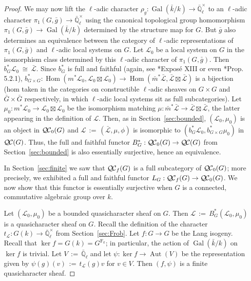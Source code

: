 \documentclass[11pt]{amsart}
\theoremstyle{plain}
\theoremstyle{definition}
\theoremstyle{remark}
\newcommand{\EE}{\mathbb{\bar Q}_\ell}
\newcommand{\bFq}{\bar{k}}
\newcommand{\Fq}{k}
\newcommand{\EEx}{\EE^\times}
\DeclareMathOperator{\Gal}{Gal}
\newcommand{\Frob}[1]{\operatorname{F}_{#1}}
\DeclareMathOperator{\Aut}{Aut}
\DeclareMathOperator{\Hom}{Hom}
\newcommand{\ceq}{{\, :=\, }}
\newcommand{\iso}{{\ \cong\ }}
\newcommand{\qcs}[1]{{\mathcal{#1}}}
\newcommand{\gqcs}[1]{{\mathcal{\bar #1}}}
\newcommand{\QC}{{\mathcal{Q\hskip-0.8pt C}}}
\newcommand{\QCb}{{\QC_0}}
\newcommand{\QCf}{{\QC_f}}
\newcommand{\trFrob}[1]{t_{#1}}
\newcommand{\bg}{\bar{g}}
\begin{document}
\begin{proof}
  We may now lift the $\ell$-adic character $\rho_g : \Gal(\bFq/\Fq) \to \EEx$
  to an $\ell$-adic character $\pi_1(G,\bg) \to \EEx$ using the canonical topological group homomorphism
  $\pi_1(G,\bg) \to \Gal(\bFq/\Fq)$ determined by the structure map for $G$. But $\bg$ also
  determines an equivalence between the category of $\ell$-adic
  representations of $\pi_1(G,\bg)$ and $\ell$-adic local systems on $G$. Let
  $\qcs{L}_0$ be a local system on $G$ in the isomorphism class
  determined by this $\ell$-adic character of $\pi_1(G,\bg)$.
  Then $b_G^*\qcs{L}_0 \iso \gqcs{L}$.
  Since $b_G^*$ is full and faithful (again, see \cite{deligne-katz:SGA7.2}*{Expos\'e XIII}
  or even \cite{beilinson-bernstein-deligne:81a}*{Prop. 5.2.1}),
  $
  b_{G\times G}^* : \Hom(m^*\qcs{L}_0,\qcs{L}_0\boxtimes\qcs{L}_0) \to \Hom({\bar m}^*\gqcs{L},\gqcs{L}\boxtimes\gqcs{L})
  $ 
  is a bijection 
  (hom taken in the categories on constructible $\ell$-adic sheaves on 
  $G\times G$ and ${\bar G}\times {\bar G}$ respectively, 
  in which $\ell$-adic local systems sit as full subcategories). 
  Let $\mu_0 : m^*\qcs{L}_0 \to \qcs{L}_0\boxtimes\qcs{L}_0$ be the isomorphism matching 
  $\mu : {\bar m}^*\gqcs{L} \to \gqcs{L}\boxtimes\gqcs{L}$, 
  the latter appearing in the definition of $\qcs{L}$. 
  Then, as in Section~\ref{sec:bounded}, $(\qcs{L}_0,\mu_0)$ is an object in $\QCb(G)$ 
  and $\qcs{L} \ceq (\gqcs{L},\mu,\phi)$ is isomorphic to $(b_G^*\qcs{L}_0,b_{G\times G}^*\mu_0)$ in $\QC(G)$.
  Thus, the full and faithful functor $B_G^* : \QCb(G) \to \QC(G)$ from Section~\ref{sec:bounded}
  is also essentially surjective, hence an equivalence.
  
  In Section~\ref{sec:finite} we saw that $\QCf(G)$ is a full subcategory of $\QCb(G)$;
  more precisely, we exhibited a full and faithful functor $L_G : \QCf(G) \to \QCb(G)$.
  We now show that this functor is essentially surjective 
  when $G$ is a connected, commutative algebraic group over $\Fq$.
  
  Let $(\qcs{L}_0,\mu_0)$ be a bounded quasicharacter sheaf on $G$. 
  Then $\qcs{L}\ceq B_G^*(\qcs{L}_0,\mu_0)$ is a quasicharacter sheaf on $G$.
  Recall the definition of the character $\trFrob{\qcs{L}} : G(\Fq) \to \EEx$ from Section~\ref{sec:Frob}. 
  Let $f : G\to G$ be the Lang isogeny.
  Recall that $\ker f = G(\Fq) = G^{\Frob{\Fq}}$; 
  in particular, the action of $\Gal(\bFq/\Fq)$ on $\ker f$ is trivial.
  Let $V \ceq \EE$ and let $\psi : \ker f \to \Aut(V)$ be the representation given by 
  $\psi(g)(v) \ceq \trFrob{\qcs{L}}(g) v$ for $v\in V$. 
  Then $(f,\psi)$ is a finite quasicharacter sheaf. 
  

\end{proof}
\end{document}
